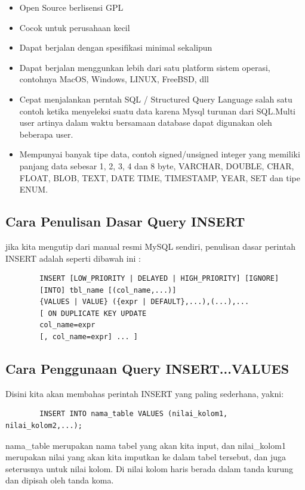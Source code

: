 	\begin{itemize}
		\item Open Source berlisensi GPL
		\item Cocok untuk perusahaan kecil
		\item Dapat berjalan dengan spesifikasi minimal sekalipun
		\item Dapat berjalan menggunkan lebih dari satu platform sistem operasi, contohnya MacOS, Windows, LINUX, FreeBSD, dll
		\item Cepat menjalankan perntah SQL / Structured Query Language salah satu contoh ketika menyeleksi suatu data karena Mysql turunan dari SQL.Multi user artinya dalam waktu bersamaan database dapat digunakan oleh beberapa user.
		\item Mempunyai banyak tipe data, contoh signed/unsigned integer yang memiliki panjang data sebesar 1, 2, 3, 4 dan 8 byte, VARCHAR, DOUBLE, CHAR, FLOAT, BLOB, TEXT, DATE TIME, TIMESTAMP, YEAR, SET dan tipe ENUM.
	\end{itemize}
	
	\subsection{Cara Penulisan Dasar Query INSERT}
	
	jika kita mengutip dari manual resmi MySQL sendiri, penulisan dasar perintah INSERT adalah seperti dibawah ini :
	
	\begin{verbatim}
		INSERT [LOW_PRIORITY | DELAYED | HIGH_PRIORITY] [IGNORE]
		[INTO] tbl_name [(col_name,...)]
		{VALUES | VALUE} ({expr | DEFAULT},...),(...),...
		[ ON DUPLICATE KEY UPDATE
		col_name=expr
		[, col_name=expr] ... ]
	\end{verbatim}
	
	\subsection{Cara Penggunaan Query INSERT...VALUES}
	Disini kita akan membahas perintah INSERT yang paling sederhana, yakni:
	
	\begin{verbatim}
		INSERT INTO nama_table VALUES (nilai_kolom1, nilai_kolom2,...);
	\end{verbatim}
	
	nama_table merupakan nama tabel yang akan kita input, dan nilai_kolom1 merupakan nilai yang akan kita imputkan ke dalam tabel tersebut, dan juga seterusnya untuk nilai kolom. Di nilai kolom haris berada dalam tanda kurung dan dipisah oleh tanda koma.
	
